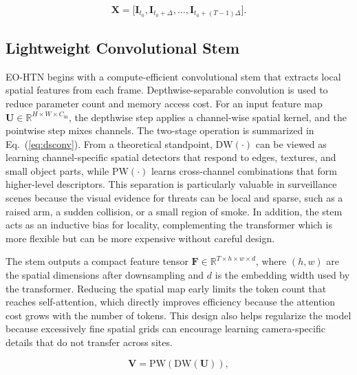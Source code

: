 \documentclass[AMA,Times1COL]{WileyNJDv5} %
\begin{document}
\begin{equation}
\mathbf{X} = \big[\mathbf{I}_{t_0}, \mathbf{I}_{t_0+\Delta}, \dots, \mathbf{I}_{t_0+(T-1)\Delta}\big] .
\label{eq:clip_sampling}
\end{equation}

\subsection{Lightweight Convolutional Stem}
EO-HTN begins with a compute-efficient convolutional stem that extracts local spatial features from each frame. Depthwise-separable convolution is used to reduce parameter count and memory access cost. For an input feature map $\mathbf{U}\in\mathbb{R}^{H\times W\times C_{\mathrm{in}}}$, the depthwise step applies a channel-wise spatial kernel, and the pointwise step mixes channels. The two-stage operation is summarized in Eq.~(\ref{eq:dsconv}). From a theoretical standpoint, $\mathrm{DW}(\cdot)$ can be viewed as learning channel-specific spatial detectors that respond to edges, textures, and small object parts, while $\mathrm{PW}(\cdot)$ learns cross-channel combinations that form higher-level descriptors. This separation is particularly valuable in surveillance scenes because the visual evidence for threats can be local and sparse, such as a raised arm, a sudden collision, or a small region of smoke. In addition, the stem acts as an inductive bias for locality, complementing the transformer which is more flexible but can be more expensive without careful design.

The stem outputs a compact feature tensor $\mathbf{F}\in\mathbb{R}^{T\times h \times w \times d}$, where $(h,w)$ are the spatial dimensions after downsampling and $d$ is the embedding width used by the transformer. Reducing the spatial map early limits the token count that reaches self-attention, which directly improves efficiency because the attention cost grows with the number of tokens. This design also helps regularize the model because excessively fine spatial grids can encourage learning camera-specific details that do not transfer across sites.

\begin{equation}
\mathbf{V} = \mathrm{PW}\!\left(\mathrm{DW}(\mathbf{U})\right),
\label{eq:dsconv}
\end{equation}
\end{document}
